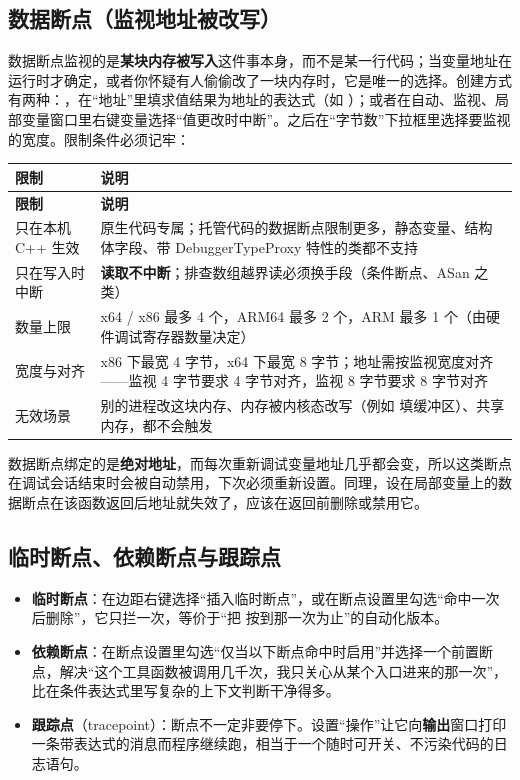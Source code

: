 \subsection{数据断点（监视地址被改写）}

数据断点监视的是\textbf{某块内存被写入}这件事本身，而不是某一行代码；当变量地址在运行时才确定，或者你怀疑有人偷偷改了一块内存时，它是唯一的选择。创建方式有两种：，在“地址”里填求值结果为地址的表达式（如 ）；或者在自动、监视、局部变量窗口里右键变量选择“值更改时中断”。之后在“字节数”下拉框里选择要监视的宽度。限制条件必须记牢：

\begin{longtable}{L{3.0cm}L{12.0cm}}\toprule
\textbf{限制} & \textbf{说明} \\ \midrule \endfirsthead
\toprule \textbf{限制} & \textbf{说明} \\ \midrule \endhead \bottomrule \endlastfoot
只在本机 C++ 生效 & 原生代码专属；托管代码的数据断点限制更多，静态变量、结构体字段、带 DebuggerTypeProxy 特性的类都不支持 \\
只在写入时中断 & \textbf{读取不中断}；排查数组越界读必须换手段（条件断点、ASan 之类） \\
数量上限 & x64 / x86 最多 4 个，ARM64 最多 2 个，ARM 最多 1 个（由硬件调试寄存器数量决定） \\
宽度与对齐 & x86 下最宽 4 字节，x64 下最宽 8 字节；地址需按监视宽度对齐——监视 4 字节要求 4 字节对齐，监视 8 字节要求 8 字节对齐 \\
无效场景 & 别的进程改这块内存、内存被内核态改写（例如  填缓冲区）、共享内存，都不会触发 \\
\end{longtable}
\begin{warnbox}[注意]
数据断点绑定的是\textbf{绝对地址}，而每次重新调试变量地址几乎都会变，所以这类断点在调试会话结束时会被自动禁用，下次必须重新设置。同理，设在局部变量上的数据断点在该函数返回后地址就失效了，应该在返回前删除或禁用它。
\end{warnbox}

\subsection{临时断点、依赖断点与跟踪点}

\begin{itemize}
  \item \textbf{临时断点}：在边距右键选择“插入临时断点”，或在断点设置里勾选“命中一次后删除”，它只拦一次，等价于“把  按到那一次为止”的自动化版本。
  \item \textbf{依赖断点}：在断点设置里勾选“仅当以下断点命中时启用”并选择一个前置断点，解决“这个工具函数被调用几千次，我只关心从某个入口进来的那一次”，比在条件表达式里写复杂的上下文判断干净得多。
  \item \textbf{跟踪点}（tracepoint）：断点不一定非要停下。设置“操作”让它向\textbf{输出}窗口打印一条带表达式的消息而程序继续跑，相当于一个随时可开关、不污染代码的日志语句。
\end{itemize}

